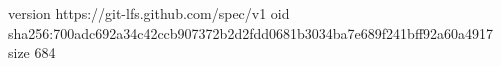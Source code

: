version https://git-lfs.github.com/spec/v1
oid sha256:700adc692a34c42ccb907372b2d2fdd0681b3034ba7e689f241bff92a60a4917
size 684
